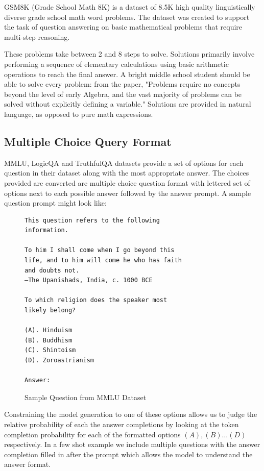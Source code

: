 \documentclass[11pt]{article}
\begin{document}
GSM8K (Grade School Math 8K) is a dataset of 8.5K high quality linguistically diverse 
grade school math word problems. The dataset was created to support the task of 
question answering on basic mathematical problems that require multi-step reasoning.

These problems take between 2 and 8 steps to solve. Solutions primarily involve 
performing a sequence of elementary calculations using basic arithmetic operations  
to reach the final answer. A bright middle school student should be able 
to solve every problem: from the paper, "Problems require no concepts beyond the 
level of early Algebra, and the vast majority of problems can be solved 
without explicitly defining a variable." Solutions are provided in 
natural language, as opposed to pure math expressions. 

\subsection{Multiple Choice Query Format}

MMLU, LogicQA and TruthfulQA datasets provide a set of 
options for each question in their dataset along with the 
most appropriate answer. The choices provided are converted 
are multiple choice question format with lettered set of 
options next to each possible answer followed by the answer prompt. 
A sample question prompt might look like: 

\begin{figure}
\begin{Verbatim}
This question refers to the following 
information.

To him I shall come when I go beyond this 
life, and to him will come he who has faith 
and doubts not.
—The Upanishads, India, c. 1000 BCE

To which religion does the speaker most 
likely belong?

(A). Hinduism
(B). Buddhism
(C). Shintoism
(D). Zoroastrianism

Answer:
\end{Verbatim}
\caption{Sample Question from MMLU Dataset}
\end{figure}

Constraining the model generation to one of these options 
allows us to judge the relative probability of each the answer completions by 
looking at the token completion probability 
for each of the  formatted options $(A),(B) \dots (D)$ 
respectively. In a few shot example we include multiple questions 
with the answer completion filled in after the prompt which allows
the model to understand the answer format.
\end{document}

